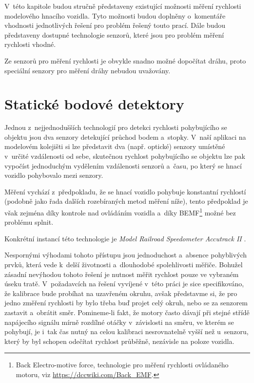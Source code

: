 V~této kapitole budou stručně představeny existující možnosti měření rychlosti
modelového hnacího vozidla. Tyto možnosti budou doplněny o~komentáře vhodnosti
jednotlivých řešení pro problém řešený touto prací. Dále budou představeny
dostupné technologie senzorů, které jsou pro problém měření rychlosti vhodné.

Ze senzorů pro měření rychlosti je obvykle snadno možné dopočítat dráhu, proto
speciální senzory pro měření dráhy nebudou uvažovány.

\section{Statické bodové detektory}
\label{sec:det-static}

Jednou z~nejjednodušších technologií pro detekci rychlosti pohybujícího se
objektu jsou dva senzory detekující průchod bodem a~stopky. V~naší aplikaci na
modelovém kolejišti si lze představit dva (např. optické) senzory umístěné
v~určité vzdálenosti od sebe, skutečnou rychlost pohybujícího se objektu lze
pak vypočíst jednoduchým vydělením vzdálenosti senzorů a~času, po který se
hnací vozidlo pohybovalo mezi senzory.

Měření vychází z~předpokladu, že se hnací vozidlo pohybuje konstantní
rychlostí (podobně jako řada dalších rozebíraných metod měření níže), tento
předpoklad je však zejména díky kontrole nad ovládáním vozidla a~díky
\gls{BEMF}\footnote{Back Electro-motive force, technologie pro měření rychlosti
ovládaného motoru, viz \url{https://dccwiki.com/Back\_EMF}.}
možné bez problému splnit.

Konkrétní instancí této technologie je \textit{Model Railroad
Speedometer Accutrack II} \cite{accutrackII}.

Nespornými výhodami tohoto přístupu jsou jednoduchost a~absence pohyblivých
prvků, která vede k~delší životnosti a~dlouhodobé spolehlivosti měřiče.
Bohužel zásadní nevýhodou tohoto řešení je nutnost měřit rychlost pouze ve
vybraném úseku tratě. V~požadavcích na řešení vyvíjené v~této práci je sice
specifikováno, že kalibrace bude probíhat na uzavřeném okruhu, avšak představme
si, že pro jedno změření rychlosti by bylo třeba buď projet celý okruh, nebo se
za senzorem zastavit a~obrátit směr. Pomineme-li fakt, že motory často dávají
při stejné střídě napájecího signálu mírně rozdílné otáčky v~závislosti na
směru, ve kterém se pohybují, je i~tak čas nutný na celou kalibraci
nesrovnatelně vyšší než u~senzoru, který by byl schopen odečítat rychlost
průběžně, nezávisle na poloze vozidla.


